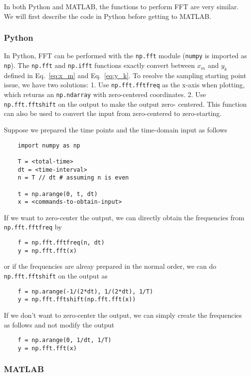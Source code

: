 \documentclass{article}
\begin{document}
In both Python and MATLAB, the functions to perform FFT are very similar. We will first describe
the code in Python before getting to MATLAB.

\subsubsection{Python}

In Python, FFT can be performed with the {\tt np.fft} module ({\tt numpy} is imported as {\tt np}).
The {\tt np.fft} and {\tt np.ifft} functions exactly convert between $x_m$ and $y_k$ defined in
Eq.~\ref{eq:x_m} and Eq.~\ref{eq:y_k}. To resolve the sampling starting point issue, we have two
solutions: 1. Use {\tt np.fft.fftfreq} as the x-axis when plotting, which returns an {\tt np.ndarray}
with zero-centered coordinates. 2. Use {\tt np.fft.fftshift} on the output to make the output zero-
centered. This function can also be used to convert the input from zero-centered to zero-starting.

Suppose we prepared the time points and the time-domain input as follows
\begin{verbatim}
    import numpy as np

    T = <total-time>
    dt = <time-interval>
    n = T // dt # assuming n is even

    t = np.arange(0, t, dt)
    x = <commands-to-obtain-input>
\end{verbatim}

If we want to zero-center the output, we can directly obtain the frequencies from {\tt np.fft.fftfreq} by
\begin{verbatim}
    f = np.fft.fftfreq(n, dt)
    y = np.fft.fft(x)
\end{verbatim}
or if the frequencies are alreay prepared in the normal order, we can do {\tt np.fft.fftshift} on the
output as
\begin{verbatim}
    f = np.arange(-1/(2*dt), 1/(2*dt), 1/T)
    y = np.fft.fftshift(np.fft.fft(x))
\end{verbatim}

If we don't want to zero-center the output, we can simply create the frequencies as follows and not modify
the output
\begin{verbatim}
    f = np.arange(0, 1/dt, 1/T)
    y = np.fft.fft(x)
\end{verbatim}

\subsubsection{MATLAB}
\end{document}
